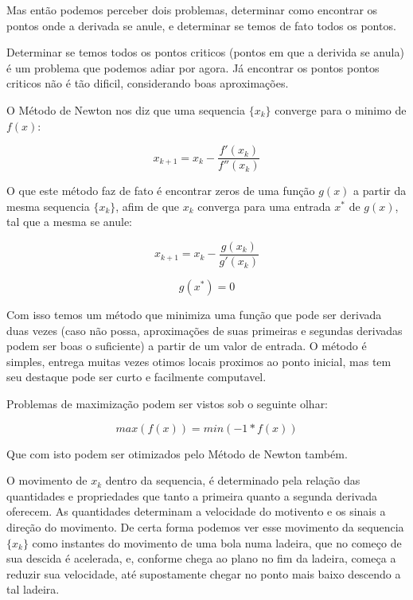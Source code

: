 Mas então podemos perceber dois problemas, determinar como encontrar os pontos
onde a derivada se anule, e determinar se temos de fato todos os pontos.

Determinar se temos todos os pontos criticos (pontos em que a derivida se anula)
é um problema que podemos adiar por agora. Já encontrar os pontos pontos
criticos não é tão dificil, considerando boas aproximações.

O Método de Newton nos diz que uma sequencia \(\{x_k\}\) converge para o minimo
de \(f(x)\):

\begin{equation}
    x_{k+1} = x_{k} - \frac {f'(x_{k})}{f''(x_{k})}
\end{equation}

O que este método faz de fato é encontrar zeros de uma função \(g(x)\) a partir
da mesma sequencia \(\{x_k\}\), afim de que \(x_k\) converga para uma entrada
\(x^*\) de \(g(x)\), tal que a mesma se anule:

\begin{equation}
    x_{k+1} = x_{k} - \frac {g(x_{k})}{g'(x_{k})}
\end{equation}

\begin{equation}
    g(x^*) = 0
\end{equation}


Com isso temos um método que minimiza uma função que pode ser derivada duas
vezes (caso não possa, aproximações de suas primeiras e segundas derivadas
podem ser boas o suficiente) a partir de um valor de entrada. O método é
simples, entrega muitas vezes otimos locais proximos ao ponto inicial, mas tem
seu destaque pode ser curto e facilmente computavel.

Problemas de maximização podem ser vistos sob o seguinte olhar:

\begin{equation}
    max(f(x)) = min(-1 * f(x))
\end{equation}

Que com isto podem ser otimizados pelo Método de Newton também.

O movimento de \(x_k\) dentro da sequencia, é determinado pela relação das
quantidades e propriedades que tanto a primeira quanto a segunda derivada
oferecem. As quantidades determinam a velocidade do motivento e os sinais a
direção do movimento. De certa forma podemos ver esse movimento da sequencia
\(\{x_k\}\) como instantes do movimento de uma bola numa ladeira, que no começo
de sua descida é acelerada, e, conforme chega ao plano no fim da ladeira, começa
a reduzir sua velocidade, até supostamente chegar no ponto mais baixo descendo a
tal ladeira.

